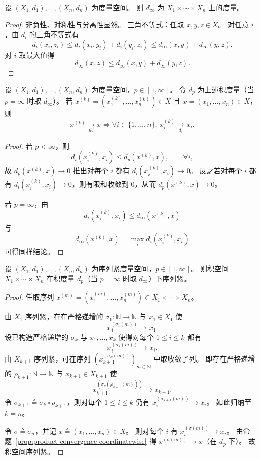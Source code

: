 \documentclass[lang=cn,a4paper,newtx,section]{elegantbook}
\begin{document}
\begin{proposition}\label{prop:product-metric-dinfty}
  设 $(X_1,d_1),\dots,(X_n,d_n)$ 为度量空间。
  则 $d_\infty$ 为 $X_1\times\cdots\times X_n$ 上的度量。
\end{proposition}

\begin{proof}
  非负性、对称性与分离性显然。
  三角不等式：任取 $x,y,z\in X$。
  对任意 $i$，由 $d_i$ 的三角不等式有
  \[
    d_i(x_i,z_i)\le d_i(x_i,y_i)+d_i(y_i,z_i)\le d_\infty(x,y)+d_\infty(y,z).
  \]
  对 $i$ 取最大值得
  \[
    d_\infty(x,z)\le d_\infty(x,y)+d_\infty(y,z).
  \]
\end{proof}

\begin{proposition}\label{prop:product-convergence-coordinatewise}
  设 $(X_1,d_1),\dots,(X_n,d_n)$ 为度量空间，$p\in[1,\infty]$。
  令 $d_p$ 为上述积度量（当 $p=\infty$ 时取 $d_\infty$）。
  若 $x^{(k)}=(x_1^{(k)},\dots,x_n^{(k)})\in X$ 且 $x=(x_1,\dots,x_n)\in X$，则
  \[
    x^{(k)}\xrightarrow[d_p]{}x
    \iff
    \forall i\in\{1,\dots,n\},\ x_i^{(k)}\xrightarrow[d_i]{}x_i.
  \]
\end{proposition}

\begin{proof}
  若 $p<\infty$，则
  \[
    d_i(x_i^{(k)},x_i)\le d_p(x^{(k)},x),\qquad \forall i,
  \]
  故 $d_p(x^{(k)},x)\to0$ 推出对每个 $i$ 都有 $d_i(x_i^{(k)},x_i)\to0$。
  反之若对每个 $i$ 都有 $d_i(x_i^{(k)},x_i)\to0$，则有限和收敛到 $0$，从而 $d_p(x^{(k)},x)\to0$。

  若 $p=\infty$，由
  \[
    d_i(x_i^{(k)},x_i)\le d_\infty(x^{(k)},x)
  \]
  与
  \[
    d_\infty(x^{(k)},x)=\max_i d_i(x_i^{(k)},x_i)
  \]
  可得同样结论。
\end{proof}

\begin{theorem}\label{thm:product-sequentially-compact}
  设 $(X_1,d_1),\dots,(X_n,d_n)$ 为序列紧度量空间，$p\in[1,\infty]$。
  则积空间 $X_1\times\cdots\times X_n$ 在积度量 $d_p$（当 $p=\infty$ 时取 $d_\infty$）下序列紧。
\end{theorem}

\begin{proof}
  任取序列 $x^{(m)}=(x_1^{(m)},\dots,x_n^{(m)})\in X_1\times\cdots\times X_n$。

  由 $X_1$ 序列紧，存在严格递增的 $\sigma_1:\mathbb{N}\to\mathbb{N}$ 与 $x_1\in X_1$ 使
  \[
    x_1^{(\sigma_1(m))}\to x_1.
  \]
  设已构造严格递增的 $\sigma_k$ 与 $x_1,\dots,x_k$ 使得对每个 $1\le i\le k$ 都有
  \[
    x_i^{(\sigma_k(m))}\to x_i.
  \]
  由 $X_{k+1}$ 序列紧，可在序列 $(x_{k+1}^{(\sigma_k(m))})_{m\in\mathbb{N}}$ 中取收敛子列。
  即存在严格递增的 $\rho_{k+1}:\mathbb{N}\to\mathbb{N}$ 与 $x_{k+1}\in X_{k+1}$ 使
  \[
    x_{k+1}^{(\sigma_k(\rho_{k+1}(m)))}\to x_{k+1}.
  \]
  令 $\sigma_{k+1}\triangleq\sigma_k\circ\rho_{k+1}$，则对每个 $1\le i\le k$ 仍有 $x_i^{(\sigma_{k+1}(m))}\to x_i$。
  如此归纳至 $k=n$。

  令 $\sigma\triangleq\sigma_n$，并记 $x\triangleq(x_1,\dots,x_n)\in X$。
  则对每个 $i$ 有 $x_i^{(\sigma(m))}\to x_i$。
  由命题~\ref{prop:product-convergence-coordinatewise} 得 $x^{(\sigma(m))}\to x$（在 $d_p$ 下）。
  故积空间序列紧。
\end{proof}
\end{document}
